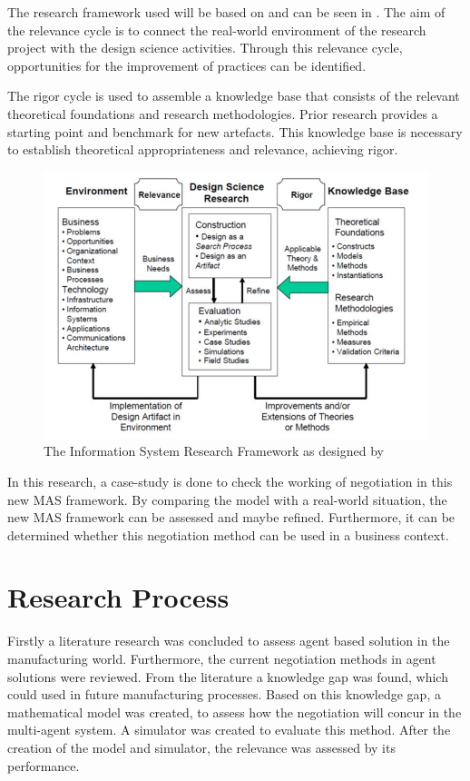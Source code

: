 The research framework used will be based on \citep{hevner2010design} and can be seen in . The aim of the relevance cycle is to connect the real-world environment of the research project with the design science activities. Through this relevance cycle, opportunities for the improvement of practices can be identified.

The rigor cycle is used to assemble a knowledge base that consists of the relevant theoretical foundations and research methodologies. Prior research provides a starting point and benchmark for new artefacts. This knowledge base is necessary to establish theoretical appropriateness and relevance, achieving rigor.

\begin{figure}[h]
	\centering
	\includegraphics[width=0.7\linewidth]{./img/InformationSystemResearchFramework.jpg}
	\caption{The Information System Research Framework as designed by \citet{hevner2010design}}
	\label{fig:InformationSystemResearchFramework}
\end{figure}

In this research, a case-study is done to check the working of negotiation in this new MAS framework. By comparing the model with a real-world situation, the new MAS framework can be assessed and maybe refined. Furthermore, it can be determined whether this negotiation method can be used in a business context.

\section{Research Process}
Firstly a literature research was concluded to assess agent based solution in the manufacturing world. Furthermore, the current negotiation methods in agent solutions were reviewed. From the literature a knowledge gap was found, which could used in future manufacturing processes. Based on this knowledge gap, a mathematical model was created, to assess how the negotiation will concur in the multi-agent system. A simulator was created to evaluate this method. After the creation of the model and simulator, the relevance was assessed by its performance.

